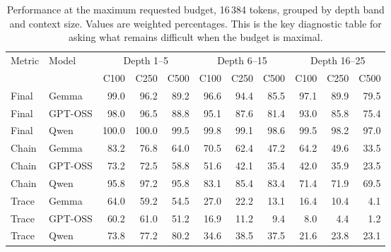 \begin{table}[t]
    \centering
    \caption{Performance at the maximum requested budget, 16\,384 tokens, grouped by depth band and context size. Values are weighted percentages. This is the key diagnostic table for asking what remains difficult when the budget is maximal.}
    \label{tab:high-budget-16384}
    \scriptsize
    \begin{tabular}{llrrrrrrrrr}
        \toprule
        Metric & Model & \multicolumn{3}{c}{Depth 1--5} & \multicolumn{3}{c}{Depth 6--15} & \multicolumn{3}{c}{Depth 16--25} \\
        \cmidrule(lr){3-5}\cmidrule(lr){6-8}\cmidrule(lr){9-11}
        & & C100 & C250 & C500 & C100 & C250 & C500 & C100 & C250 & C500 \\
        \midrule
        Final & Gemma & 99.0 & 96.2 & 89.2 & 96.6 & 94.4 & 85.5 & 97.1 & 89.9 & 79.5 \\
        Final & GPT-OSS & 98.0 & 96.5 & 88.8 & 95.1 & 87.6 & 81.4 & 93.0 & 85.8 & 75.4 \\
        Final & Qwen & 100.0 & 100.0 & 99.5 & 99.8 & 99.1 & 98.6 & 99.5 & 98.2 & 97.0 \\
        \midrule
        Chain & Gemma & 83.2 & 76.8 & 64.0 & 70.5 & 62.4 & 47.2 & 64.2 & 49.6 & 33.5 \\
        Chain & GPT-OSS & 73.2 & 72.5 & 58.8 & 51.6 & 42.1 & 35.4 & 42.0 & 35.9 & 23.5 \\
        Chain & Qwen & 95.8 & 97.2 & 95.8 & 83.1 & 85.4 & 83.4 & 71.4 & 71.9 & 69.5 \\
        \midrule
        Trace & Gemma & 64.0 & 59.2 & 54.5 & 27.0 & 22.2 & 13.1 & 16.4 & 10.4 & 4.1 \\
        Trace & GPT-OSS & 60.2 & 61.0 & 51.2 & 16.9 & 11.2 & 9.4 & 8.0 & 4.4 & 1.2 \\
        Trace & Qwen & 73.8 & 77.2 & 80.2 & 34.6 & 38.5 & 37.5 & 21.6 & 23.8 & 23.1 \\
        \bottomrule
    \end{tabular}
\end{table}
